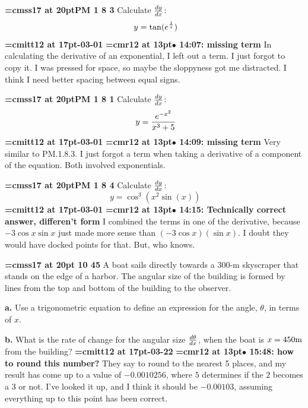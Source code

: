 {\medskip\noindent\bf\font\titlefont=cmss17 at 20pt\titlefont PM 1 8 3}\medskip
Calculate ${dy \over dx}$:
$$\
y = \tan(e^{1 \over x})
$$
{\medskip\noindent\bf\font\titlefont=cmitt12 at 17pt-03-01}\medskip
{\smallskip\noindent\bf\font\titlefont=cmr12 at 13pt\titlefont $\bullet$ 14:07: missing term}\smallskip
In calculating the derivative of an exponential, I left out a term. I just forgot to copy it. I was pressed for space, so maybe the sloppyness got me distracted. I think I need better spacing between equal signs.
\par

{\medskip\noindent\bf\font\titlefont=cmss17 at 20pt\titlefont PM 1 8 1}\medskip
Calculate ${dy \over dx}$:
$$\
y = {
e^{-x^2}
\over
x^3 + 5
}
$$
{\medskip\noindent\bf\font\titlefont=cmitt12 at 17pt-03-01}\medskip
{\smallskip\noindent\bf\font\titlefont=cmr12 at 13pt\titlefont $\bullet$ 14:09: missing term}\smallskip
Very similar to PM.1.8.3. I just forgot a term when taking a derivative of a component of the equation. Both involved exponentials.
\par

{\medskip\noindent\bf\font\titlefont=cmss17 at 20pt\titlefont PM 1 8 4}\medskip
Calculate ${dy \over dx}$:
$$\
y = \cos^3(x^2 \sin(x))
$$
{\medskip\noindent\bf\font\titlefont=cmitt12 at 17pt-03-01}\medskip
{\smallskip\noindent\bf\font\titlefont=cmr12 at 13pt\titlefont $\bullet$ 14:15: Technically correct answer, differen't form}\smallskip
I combined the terms in one of the derivative, because $-3\cos x \sin x$ just made more sense than $(-3 \cos x)(\sin x)$. I doubt they would have docked points for that. But, who knows.
\par

\xrdef{node91}
{\medskip\noindent\bf\font\titlefont=cmss17 at 20pt 10 45}\medskip
A boat sails directly towards a 300-m skyscraper that
stands on the edge of a harbor. The angular size of the building
is formed by lines from the top and bottom of the building
to the observer.
\par {\bf a.}
Use a trigonometric equation to define an expression
for the angle, $\theta$, in terms of $x$.
\par {\bf b.}
What is the rate of change for the angular size ${d\theta \over dx}$,
when the boat is $x = 450 \hbox{m}$ from the building?
{\medskip\noindent\bf\font\titlefont=cmitt12 at 17pt-03-22}\medskip
{\smallskip\noindent\bf\font\titlefont=cmr12 at 13pt\titlefont $\bullet$ 15:48: how to round this number?}\smallskip
They say to round to the nearest 5 places, and my result has come up to a value of $-0.0010256$, where $5$ determines if the $2$ becomes a $3$ or not. I've looked it up, and I think it should be $-0.00103$, assuming everything up to this point has been correct.
\par

